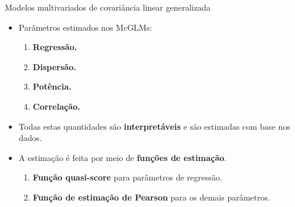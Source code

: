 \documentclass[
  ignorenonframetext,
  serif,
  professionalfont,
  usenames,
  dvipsnames,
  aspectratio = 169]{beamer}
\begin{document}
\begin{frame}{Modelos multivariados de covariância linear generalizada}
\protect\hypertarget{modelos-multivariados-de-covariuxe2ncia-linear-generalizada-7}{}
\begin{itemize}

\itemsep 2ex
  
  \item Parâmetros estimados nos McGLMs:
    \begin{enumerate}
      \item \textbf{Regressão.}
      \item \textbf{Dispersão.}
      \item \textbf{Potência.}
      \item \textbf{Correlação.}
    \end{enumerate}
  
  \item Todas estas quantidades são \textbf{interpretáveis} e são estimadas com base nos dados.
  
  \item A estimação é feita por meio de \textbf{funções de estimação}.
    \begin{enumerate}
      \item \textbf{Função quasi-score} para parâmetros de regressão. 
      \item \textbf{Função de estimação de Pearson} para os demais parâmetros. 
    \end{enumerate}

\end{itemize}
\end{frame}
\end{document}
